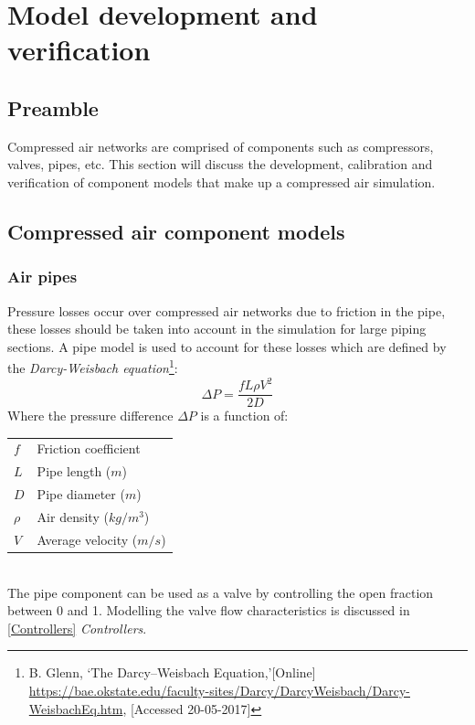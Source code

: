 \section{Model development and verification}
	\subsection{Preamble}
	Compressed air networks are comprised of components such as compressors, valves, pipes, etc. This section will discuss the development, calibration and verification of component models that make up a compressed air simulation. 
	\subsection{Compressed air component models}
		\subsubsection{Air pipes}
		Pressure losses occur over compressed air networks due to friction in the pipe, these losses should be taken into account in the simulation for large piping sections. A pipe model is used to account for these losses which are defined by the \textit{Darcy-Weisbach equation}\footnote{ B. Glenn, \enquote*{The Darcy–Weisbach Equation,}[Online] \url{https://bae.okstate.edu/faculty-sites/Darcy/DarcyWeisbach/Darcy-WeisbachEq.htm}, [Accessed 20-05-2017]}:
		$$\Delta P = \frac{f  L \rho V^2}{2 D}$$
		Where the pressure difference $\Delta P $ is a function of:\\
		\begin{tabular}{p{1.3cm}p{13cm}}
		$f$ & Friction coefficient  \\
		$L$ & Pipe length ($m$) \\
		$D$ & Pipe diameter ($m$) \\
		$\rho$ & Air density ($kg/m^3$)\\	
		$V$ & Average velocity ($m/s$) \\
		\end{tabular} \\
		The pipe component can be used as a valve by controlling the open fraction between 0 and 1. Modelling the valve flow characteristics is discussed in \ref{Controllers} \textit{Controllers}.
